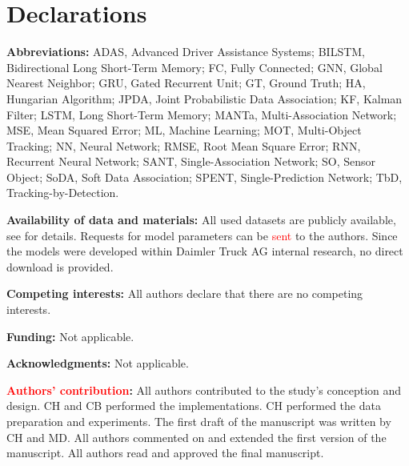 \documentclass[letterpaper, 10 pt, journal, twoside]{IEEEtran}
\newcommand{\red}[1]{\textcolor{red}{#1}}
\begin{document}
\section*{Declarations}
\small{
\noindent
\textbf{Abbreviations:} ADAS, Advanced Driver Assistance Systems; BILSTM, Bidirectional Long Short-Term Memory; FC, Fully Connected; GNN, Global Nearest Neighbor; GRU, Gated Recurrent Unit; GT, Ground Truth; HA, Hungarian Algorithm; JPDA, Joint Probabilistic Data Association; KF, Kalman Filter; LSTM, Long Short-Term Memory; MANTa, Multi-Association Network; MSE, Mean Squared Error; ML, Machine Learning; MOT, Multi-Object Tracking; NN, Neural Network; RMSE, Root Mean Square Error; RNN, Recurrent Neural Network; SANT, Single-Association Network; SO, Sensor Object; SoDA, Soft Data Association; SPENT, Single-Prediction Network; TbD, Tracking-by-Detection.

\noindent
	\textbf{Availability of data and materials:} All used datasets are publicly available, see {\cite{Geiger2012CVPR}} for details. Requests for model parameters can be \red{sent} to the authors. Since the models were developed within Daimler Truck AG internal research, no direct download is provided.

\noindent
\textbf{Competing interests:} All authors declare that there are no competing interests.

\noindent
\textbf{Funding:} Not applicable.

\noindent
\textbf{Acknowledgments:} Not applicable.

\noindent
	\textbf{\red{Authors' contribution}:} All authors contributed to the study’s conception and design. CH and CB performed the implementations. CH performed the data preparation and experiments. The first draft of the manuscript was written by CH and MD. All authors commented on and extended the first version of the manuscript. All authors read and approved the final manuscript.
}




\vfill
\end{document}
